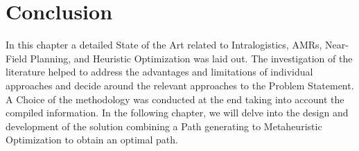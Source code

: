 \section*{Conclusion}

In this chapter a detailed State of the Art related to Intralogistics, AMRs, Near-Field Planning, and Heuristic 
Optimization was laid out. The investigation of the literature helped to address the advantages and limitations
of individual approaches and decide around the relevant approaches to the Problem Statement. 
A Choice of the methodology was conducted at the end taking into account the compiled information.
In the following chapter, we will delve into the design and development of the solution 
combining a Path generating to Metaheuristic Optimization to obtain an optimal path.

